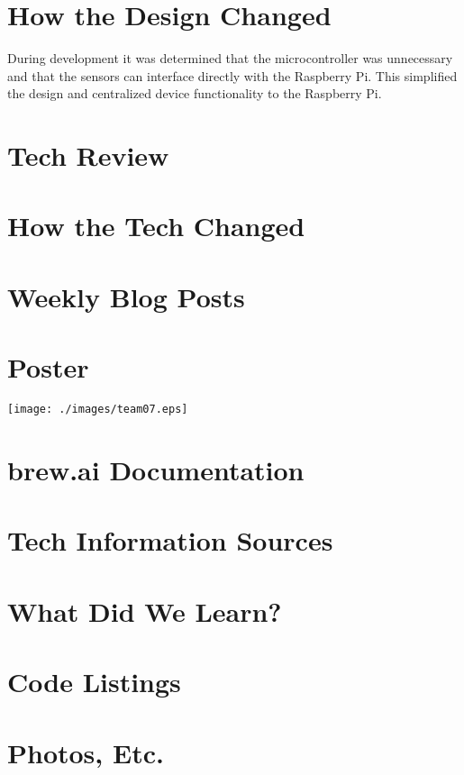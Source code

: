 \documentclass[draftclsnofoot,onecolumn,letterpaper,10pt]{IEEEtran}
\begin{document}
\section{How the Design Changed}

During development it was determined that the microcontroller was unnecessary and that the sensors can interface directly with the Raspberry Pi.
This simplified the design and centralized device functionality to the Raspberry Pi.

\section{Tech Review}


\section{How the Tech Changed}
\section{Weekly Blog Posts}


\section{Poster}
\newpage
\vfill
\begin{sidewaysfigure}[ht]
\texttt{[image: ./images/team07.eps]}
\end{sidewaysfigure}
\vfill
\clearpage


\section{brew.ai Documentation}
\section{Tech Information Sources}
\section{What Did We Learn?}

\appendix
\section{Code Listings}
\section{Photos, Etc.}
\end{document}
